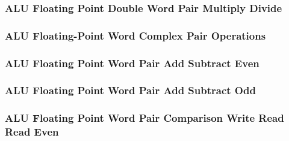 

\subsubsection[{\small ALU Floating Point Double Word Pair Multiply Divide}]{ALU Floating Point Double Word Pair Multiply Divide} \label{sec:format-ALU-FDPMUL}



\subsubsection[{\small ALU Floating-Point Word Complex Pair Operations}]{ALU Floating-Point Word Complex Pair Operations} \label{sec:format-ALU-FWCPOP}



\subsubsection[{\small ALU Floating Point Word Pair Add Subtract Even}]{ALU Floating Point Word Pair Add Subtract Even} \label{sec:format-ALU-FWPADDE}



\subsubsection[{\small ALU Floating Point Word Pair Add Subtract Odd}]{ALU Floating Point Word Pair Add Subtract Odd} \label{sec:format-ALU-FWPADDO}



\subsubsection[{\small ALU Floating Point Word Pair Comparison Write Read Read Even}]{ALU Floating Point Word Pair Comparison Write Read Read Even} \label{sec:format-ALU-FWPCWRRE}

